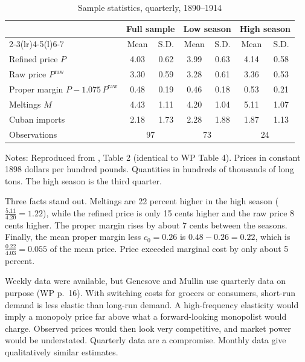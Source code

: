 \begin{table}[htbp]
\centering
\caption{Sample statistics, quarterly, 1890--1914}\label{tab:03-gm-stats}
\small
\begin{tabular}{@{}lcccccc@{}}
\toprule
 & \multicolumn{2}{c}{Full sample} & \multicolumn{2}{c}{Low season} & \multicolumn{2}{c}{High season}\\
\cmidrule(lr){2-3}\cmidrule(lr){4-5}\cmidrule(l){6-7}
 & Mean & S.D. & Mean & S.D. & Mean & S.D.\\
\midrule
Refined price $P$ & 4.03 & 0.62 & 3.99 & 0.63 & 4.14 & 0.58\\
Raw price $P^{\mathrm{raw}}$ & 3.30 & 0.59 & 3.28 & 0.61 & 3.36 & 0.53\\
Proper margin $P - 1.075\,P^{\mathrm{raw}}$ & 0.48 & 0.19 & 0.46 & 0.18 & 0.53 & 0.21\\
Meltings $M$ & 4.43 & 1.11 & 4.20 & 1.04 & 5.11 & 1.07\\
Cuban imports & 2.18 & 1.73 & 2.28 & 1.88 & 1.87 & 1.13\\
Observations & \multicolumn{2}{c}{97} & \multicolumn{2}{c}{73} & \multicolumn{2}{c}{24}\\
\bottomrule
\end{tabular}

\smallskip
\begin{minipage}{0.92\textwidth}\footnotesize
Notes: Reproduced from \citet{GenesoveMullin1998}, Table 2 (identical to WP Table 4). Prices in constant
1898 dollars per hundred pounds. Quantities in hundreds of thousands of long tons. The high season is the
third quarter.
\end{minipage}
\end{table}

Three facts stand out. Meltings are 22 percent higher in the high season ($\frac{5.11}{4.20} = 1.22$), while
the refined price is only 15 cents higher and the raw price 8 cents higher. The proper margin rises by about
7 cents between the seasons. Finally, the mean proper margin less $c_0 = 0.26$ is $0.48 - 0.26 = 0.22$,
which is $\frac{0.22}{4.03} = 0.055$ of the mean price. Price exceeded marginal cost by only about 5
percent.

Weekly data were available, but Genesove and Mullin use quarterly data on purpose (WP p.~16). With switching
costs for grocers or consumers, short-run demand is less elastic than long-run demand. A high-frequency
elasticity would imply a monopoly price far above what a forward-looking monopolist would charge. Observed
prices would then look very competitive, and market power would be understated. Quarterly data are a
compromise. Monthly data give qualitatively similar estimates.

